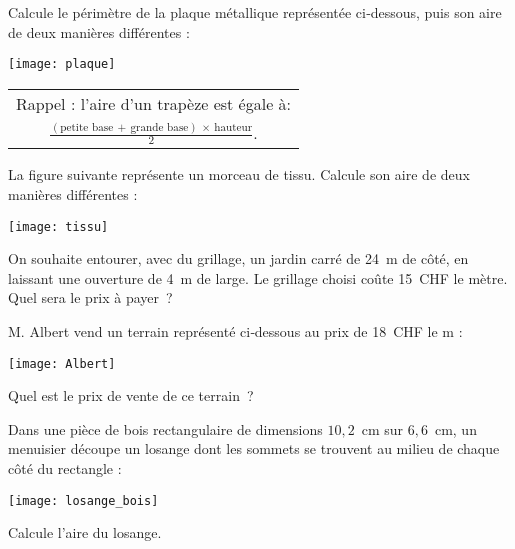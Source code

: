\begin{exercice}
Calcule le périmètre de la plaque métallique représentée ci‑dessous, puis son aire de deux manières différentes :
\begin{center} \texttt{[image: plaque]} \end{center}
\end{exercice}

\begin{center}
    \begin{tabular}{|>{\columncolor{J2}}c|}
    \hline
    Rappel : l'aire d'un trapèze est égale à:\\
    $\frac{{(\text{petite base}\, +\, \text{grande base})} \, \times \, {\text{hauteur}}}{2}$.\\
    \hline
\end{tabular}
\end{center}


\begin{exercice}
La figure suivante représente un morceau de tissu. Calcule son aire de deux manières différentes :
\begin{center} \texttt{[image: tissu]} \end{center}
\end{exercice}


\begin{exercice}
On souhaite entourer, avec du grillage, un jardin carré de 24 m de côté, en laissant une ouverture de 4 m de large. Le grillage choisi coûte 15 CHF le mètre. Quel sera le prix à payer ?
\end{exercice}


\begin{exercice}
M. Albert vend un terrain représenté ci‑dessous au prix de 18 CHF le m :
\begin{center} \texttt{[image: Albert]} \end{center}
Quel est le prix de vente de ce terrain ?
\end{exercice}


\begin{exercice}
Dans une pièce de bois rectangulaire de dimensions $10,2$ cm sur $6,6$ cm, un menuisier découpe un losange dont les sommets se trouvent au milieu de chaque côté du rectangle :
\begin{center} \texttt{[image: losange\_bois]} \end{center}
Calcule l'aire du losange.
\end{exercice}


